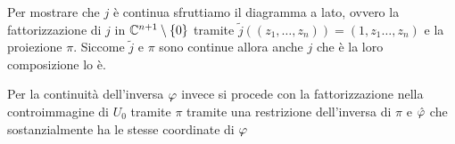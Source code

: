 \begin{itemize}
	\begin{minipage}[t]{0.55\textwidth}
		Per mostrare che $j$ è continua sfruttiamo il diagramma a lato, ovvero la fattorizzazione di $j$ in $\mathbb{C}^{n+1}\setminus\{0\}$ tramite $\widetilde{j}((z_1,\dots,z_n))=(1,z_1\dots,z_n)$ e la proiezione $\pi$. Siccome $\widetilde{j}$ e $\pi$ sono continue allora anche $j$ che è la loro composizione lo è.
	\end{minipage}
	\begin{minipage}[t]{0.13\textwidth}\vspace{-10pt}
	\end{minipage}
	\begin{minipage}[t]{0.55\textwidth}
		Per la continuità dell'inversa $\oldphi$ invece si procede con la fattorizzazione nella controimmagine di $U_0$ tramite $\pi$ tramite una restrizione dell'inversa di $\pi$ e $\hat{\oldphi}$ che sostanzialmente ha le stesse coordinate di $\oldphi$
		
		
	\end{minipage}
	\begin{minipage}[t]{0.13\textwidth}\vspace{-10pt}
	\end{minipage}
\end{itemize}

